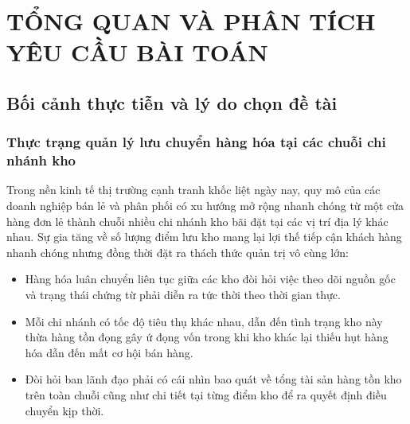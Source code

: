 \documentclass[12pt,a4paper]{report}
\renewcommand{\_}{\textunderscore\allowbreak}
\begin{document}
\cleardoublepage

\tableofcontents
\cleardoublepage

\listoffigures
{}
\cleardoublepage

\listoftables
{}
\cleardoublepage

\chapter{TỔNG QUAN VÀ PHÂN TÍCH YÊU CẦU BÀI TOÁN}

\section{Bối cảnh thực tiễn và lý do chọn đề tài}

\subsection{Thực trạng quản lý lưu chuyển hàng hóa tại các chuỗi chi nhánh kho}
Trong nền kinh tế thị trường cạnh tranh khốc liệt ngày nay, quy mô của các doanh nghiệp bán lẻ và phân phối có xu hướng mở rộng nhanh chóng từ một cửa hàng đơn lẻ thành chuỗi nhiều chi nhánh kho bãi đặt tại các vị trí địa lý khác nhau. Sự gia tăng về số lượng điểm lưu kho mang lại lợi thế tiếp cận khách hàng nhanh chóng nhưng đồng thời đặt ra thách thức quản trị vô cùng lớn:
\begin{itemize}
    \item Hàng hóa luân chuyển liên tục giữa các kho đòi hỏi việc theo dõi nguồn gốc và trạng thái chứng từ phải diễn ra tức thời theo thời gian thực.
    \item Mỗi chi nhánh có tốc độ tiêu thụ khác nhau, dẫn đến tình trạng kho này thừa hàng tồn đọng gây ứ đọng vốn trong khi kho khác lại thiếu hụt hàng hóa dẫn đến mất cơ hội bán hàng.
    \item Đòi hỏi ban lãnh đạo phải có cái nhìn bao quát về tổng tài sản hàng tồn kho trên toàn chuỗi cũng như chi tiết tại từng điểm kho để ra quyết định điều chuyển kịp thời.
\end{itemize}
\end{document}
